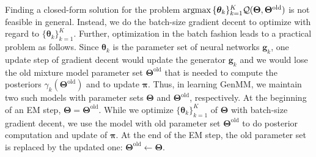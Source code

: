 Finding a closed-form solution for the problem $\operatorname{argmax}{\{\bm{\theta}_k\}_{k=1}^{K}}{ \mathcal{Q} (\bm{\Theta},\bm{\Theta}^{\mathrm{old}})}$ is not feasible in general. Instead, we do the batch-size gradient decent to optimize with regard to $\{\bm{\theta}_k\}_{k=1}^{K}$.
Further, optimization in the batch fashion leads to a practical problem as follows. 
Since $\bm{\theta}_k$ is the parameter set of neural networks $\bm{g}_k$, one update step of gradient decent would update the generator $\bm{g}_k$ and we would lose the old mixture model parameter set $\bm{\Theta}^{\mathrm{old}}$ that is needed to compute the posteriors $\gamma_k(\bm{\Theta}^{\mathrm{old}})$ and to update $\bm{\pi}$. Thus, in learning GenMM, we maintain two such models with parameter sets $\bm{\Theta}$ and $\bm{\Theta}^{\mathrm{old}}$, respectively. At the beginning of an EM step, $\bm{\Theta} = \bm{\Theta}^{\mathrm{old}}$. While we optimize $\{\bm{\theta}_k\}_{k=1}^{K}$ of $\bm{\Theta}$ with batch-size gradient decent, we use the model with old parameter set $\bm{\Theta}^{\mathrm{old}}$ to do posterior computation and update of $\bm{\pi}$. At the end of the EM step, the old parameter set is replaced by the updated one: $\bm{\Theta}^{\mathrm{old}}\gets \bm{\Theta}$.


